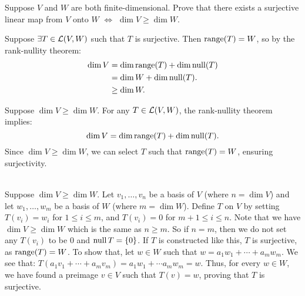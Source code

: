 \begin{xrcs}
  Suppose $V$ and $W$ are both finite-dimensional. Prove that there exists a surjective linear map from $V$ onto $W$ $\iff$ $\dim V \geq \dim W$.

  \begin{xprf}
    \Rightarrowdirection Suppose $\exists T \in \mathcal{L}(V,W)$ such that $T$ is surjective. Then $\operatorname{range}(T) = W$, so by the rank-nullity theorem:
    \begin{equation}
      \begin{aligned}
        \dim V &=    \dim \operatorname{range}(T) + \dim \operatorname{null}(T) \\
        &=    \dim W + \dim \operatorname{null}(T). \\
        &\geq \dim W.
      \end{aligned}
    \end{equation}

    \Leftarrowdirection Suppose $\dim V \geq \dim W$. For any $T \in \mathcal{L}(V,W)$, the rank-nullity theorem implies:
    \begin{equation}
      \dim V = \dim \operatorname{range}(T) + \dim \operatorname{null}(T).
    \end{equation}
    Since $\dim V \geq \dim W$, we can select $T$ such that $\operatorname{range}(T) = W$, ensuring surjectivity.

     \\
    Suppose $\dim V \geq \dim W$. Let $v_1, \dots, v_n$ be a basis of $V$ (where $n = \dim V$) and let $w_1, \dots, w_m$ be a basis of $W$ (where $m = \dim W$).  Define $T$ on $V$ by setting $T(v_i) = w_i$ for $1 \leq i \leq m$, and $T(v_i) = 0$ for $m+1 \leq i \leq n$. Note that we have $\dim V \geq \dim W$ which is the same as $n \geq m$. So if $n = m$, then we do not set any $T(v_i)$ to be $0$ and $\operatorname{null} T = \{0\}$. If $T$ is constructed like this, $T$ is surjective, as $\operatorname{range}(T) = W$. To show that, let $w \in W$ such that
    $
    w = a_1 w_1 + \cdots + a_m w_m.
    $
    We see that: $T(a_1 v_1 + \cdots + a_m v_m)= a_1 w_1 + \cdots a_m w_m = w$. Thus, for every $w \in W$, we have found a preimage $v \in V$ such that $T(v) = w$, proving that $T$ is surjective.
  \end{xprf}
\end{xrcs}



